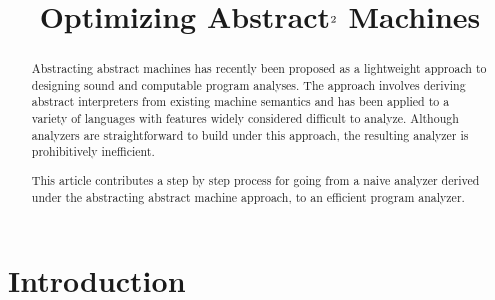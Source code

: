 \documentclass[preprint,onecolumn,9pt]{sigplanconf} %
\begin{document}
\copyrightdata{[to be supplied]}


\title{Optimizing Abstract$^{\text 2}$ Machines}

\authorinfo{}{}{}

\maketitle

\begin{abstract}
Abstracting abstract machines has recently been proposed as a
lightweight approach to designing sound and computable program
analyses.  The approach involves deriving abstract interpreters from
existing machine semantics and has been applied to a variety of
languages with features widely considered difficult to analyze.
Although analyzers are straightforward to build under this approach,
the resulting analyzer is prohibitively inefficient.

This article contributes a step by step process for going from a naive
analyzer derived under the abstracting abstract machine approach, to
an efficient program analyzer.
\end{abstract}




\section{Introduction}
\end{document}
